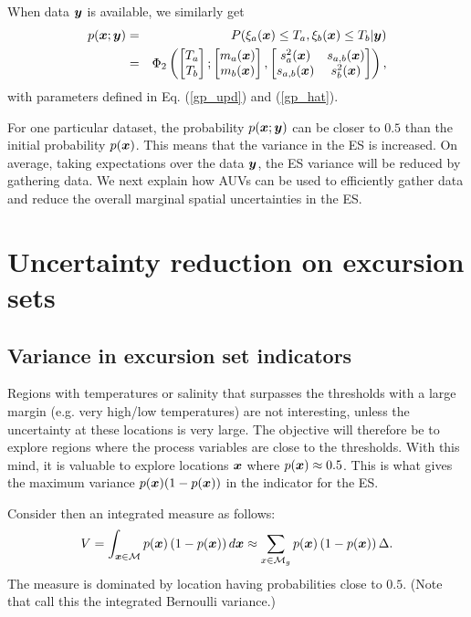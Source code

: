 \documentclass[aoas]{imsart}
\begin{document}
When data ${\boldsymbol y}$ is available, we similarly get
\begin{eqnarray}\label{eq:prob_mv}
 p(\bx;\by) &=& P(\xi_a(\bx) \leq T_a, \xi_b(\bx) \leq T_b |\by) 
 \nonumber \\
 &=& \Phi_2 \begin{pmatrix} 
\begin{bmatrix} T_a\\
T_b
\end{bmatrix};
\begin{bmatrix} m_{a}(\bx)\\
m_{b}(\bx)
\end{bmatrix},\begin{bmatrix}
s_{a}^2(\bx) & s_{a,b}(\bx)  \\
s_{a,b}(\bx)  & s_{b}^2(\bx)  
\end{bmatrix}\end{pmatrix},
\end{eqnarray}
with parameters defined in Eq. (\ref{gp_upd}) and (\ref{gp_hat}). 

For one particular dataset, the probability $p({\boldsymbol x};{\boldsymbol y})$ can be closer to $0.5$ than the initial probability $p({\boldsymbol x})$. This means that the variance in the ES is increased. On average, taking expectations over the data ${\boldsymbol y}$, the ES variance will be reduced by gathering data. We next explain how AUVs can be used to efficiently gather data and reduce the overall marginal spatial uncertainties in the ES. 

\section{Uncertainty reduction on excursion sets}\label{sec:sur}

\subsection{Variance in excursion set indicators}

Regions with temperatures or salinity that surpasses the thresholds with a large margin (e.g. very high/low temperatures) are not interesting, unless the uncertainty at these locations is very large. The objective will therefore be to explore regions where the process variables are close to the thresholds. With this mind, it is valuable to explore locations ${\boldsymbol x}$ where $p({\boldsymbol x}) \approx 0.5$. This is what gives the maximum variance $p({\boldsymbol x}) (1-p({\boldsymbol x}))$ in the indicator for the ES. 

Consider then an integrated measure as follows:
\begin{equation}\label{measVAR}
    V = \int_{\bx \in \mathcal{M}} p(\bx) \left(1-p(\bx)\right) d\bx \approx \sum_{x \in \mathcal{M}_g} p(\bx) \left(1-p(\bx)\right) \Delta.
\end{equation}
The measure is dominated by location having probabilities close to $0.5$. 
(Note that \cite{Bect2019} call this the integrated Bernoulli variance.)
\end{document}
